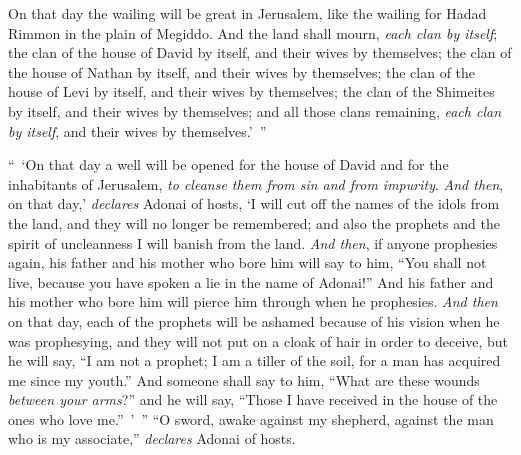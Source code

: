 \begin{biblechapter}
\verse On that day the wailing will be great in Jerusalem, like the wailing for Hadad Rimmon in the plain of Megiddo.
\verse And the land shall mourn, \textit{each clan by itself}; the clan of the house of David by itself, and their wives by themselves; the clan of the house of Nathan by itself, and their wives by themselves;
\verse the clan of the house of Levi by itself, and their wives by themselves; the clan of the Shimeites by itself, and their wives by themselves;
\verse and all those clans remaining, \textit{each clan by itself}, and their wives by themselves.’ ”
\end{biblechapter}

\begin{biblechapter} %
\verse “ ‘On that day a well will be opened for the house of David and for the inhabitants of Jerusalem, \textit{to cleanse them from sin and from impurity}.
\verse \textit{And then}, on that day,’ \textit{declares} Adonai of hosts, ‘I will cut off the names of the idols from the land, and they will no longer be remembered; and also the prophets and the spirit of uncleanness I will banish from the land.
\verse \textit{And then}, if anyone prophesies again, his father and his mother who bore him will say to him, “You shall not live, because you have spoken a lie in the name of Adonai!” And his father and his mother who bore him will pierce him through when he prophesies.
\verse \textit{And then} on that day, each of the prophets will be ashamed because of his vision when he was prophesying, and they will not put on a cloak of hair in order to deceive,
\verse but he will say, “I am not a prophet; I am a tiller of the soil, for a man has acquired me since my youth.”
\verse And someone shall say to him, “What are these wounds \textit{between your arms}?” and he will say, “Those I have received in the house of the ones who love me.” ’ ”
 “O sword, awake against my shepherd, 
against the man who is my associate,” 
\textit{declares} Adonai of hosts. 

\end{biblechapter}
